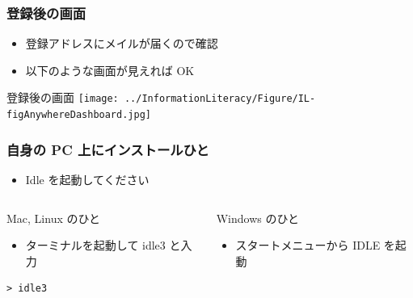 \begin{frame}
\frametitle{登録後の画面}
  \begin{itemize}
\item 登録アドレスにメイルが届くので確認
\item 以下のような画面が見えれば OK
  \end{itemize}
  \begin{itembox}{登録後の画面}
\texttt{[image: ../InformationLiteracy/Figure/IL-figAnywhereDashboard.jpg]}
  \end{itembox}
\end{frame}
\begin{frame}
\frametitle{自身の PC 上にインストールひと}
  \begin{itemize}
\item Idle を起動してください
  \end{itemize}
  \begin{columns}[t]
    \begin{column}{0.5\textwidth}
      \begin{itembox}{\footnotesize Mac, Linux のひと}
        \begin{itemize}
\scriptsize
\item ターミナルを起動して idle3 と入力
        \end{itemize}
        \begin{verbatim}
> idle3
        \end{verbatim}
      \end{itembox}
    \end{column}
    \begin{column}{0.5\textwidth}
      \begin{itembox}{\footnotesize Windows のひと}
        \begin{itemize}
\item スタートメニューから IDLE を起動
        \end{itemize}
      \end{itembox}
    \end{column}
  \end{columns}
\end{frame}
